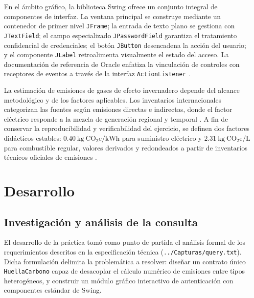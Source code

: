 \documentclass[letterpaper,12pt,oneside]{article}
\numberwithin{figure}{section}
\begin{document}
En el \'ambito gr\'afico, la biblioteca Swing ofrece un conjunto integral de componentes de interfaz. La ventana principal se construye mediante un contenedor de primer nivel \texttt{JFrame}; la entrada de texto plano se gestiona con \texttt{JTextField}; el campo especializado \texttt{JPasswordField} garantiza el tratamiento confidencial de credenciales; el bot\'on \texttt{JButton} desencadena la acci\'on del usuario; y el componente \texttt{JLabel} retroalimenta visualmente el estado del acceso. La documentaci\'on de referencia de Oracle enfatiza la vinculaci\'on de controles con receptores de eventos a trav\'es de la interfaz \texttt{ActionListener} \cite{swing}.

La estimaci\'on de emisiones de gases de efecto invernadero depende del alcance metodol\'ogico y de los factores aplicables. Los inventarios internacionales categorizan las fuentes seg\'un emisiones directas e indirectas, donde el factor el\'ectrico responde a la mezcla de generaci\'on regional y temporal \cite{epaelectric}. A fin de conservar la reproducibilidad y verificabilidad del ejercicio, se definen dos factores did\'acticos estables: $0.40\ \mathrm{kg\ CO_2e/kWh}$ para suministro el\'ectrico y $2.31\ \mathrm{kg\ CO_2e/L}$ para combustible regular, valores derivados y redondeados a partir de inventarios t\'ecnicos oficiales de emisiones \cite{epafactors}.

\clearpage
\section{Desarrollo}

\subsection{Investigaci\'on y an\'alisis de la consulta}
El desarrollo de la pr\'actica tom\'o como punto de partida el an\'alisis formal de los requerimientos descritos en la especificaci\'on t\'ecnica (\texttt{../Capturas/query.txt}). Dicha formulaci\'on delimita la problem\'atica a resolver: dise\~nar un contrato \'unico \texttt{HuellaCarbono} capaz de desacoplar el c\'alculo num\'erico de emisiones entre tipos heterog\'eneos, y construir un m\'odulo gr\'afico interactivo de autenticaci\'on con componentes est\'andar de Swing.
\end{document}
